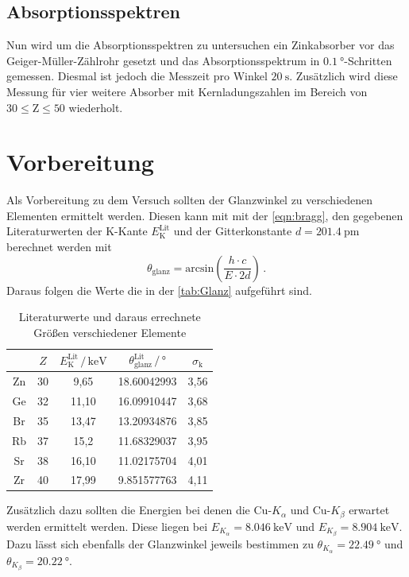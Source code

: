 \subsection{Absorptionsspektren}
Nun wird um die Absorptionsspektren zu untersuchen ein Zinkabsorber vor das Geiger-Müller-Zählrohr gesetzt und das Absorptionsspektrum in $\SI{0.1}{\degree}$-Schritten gemessen. Diesmal ist
jedoch die Messzeit pro Winkel $\SI{20}{\second}$. Zusätzlich wird diese Messung für vier weitere Absorber mit Kernladungszahlen im Bereich von $30 \leq \text{Z} \leq 50$ wiederholt.



\section{Vorbereitung}
Als Vorbereitung zu dem Versuch sollten der Glanzwinkel zu verschiedenen Elementen ermittelt werden. Diesen kann mit mit der \autoref{eqn:bragg}, den gegebenen Literaturwerten der 
K-Kante $E_\text{K}^\text{Lit}$ \cite{wissen} und der Gitterkonstante $d = \SI{201.4}{\pico\meter}$ berechnet werden mit 
\begin{equation}
    \theta_\text{glanz} = \text{arcsin}\left(\frac{h \cdot c}{E \cdot 2d}\right) \, .
    \label{eqn:theta}
\end{equation}
\noindent
Daraus folgen die Werte die in der \autoref{tab:Glanz} aufgeführt sind. 
\begin{table}
    \centering
    \caption{Literaturwerte und daraus errechnete Größen verschiedener Elemente}
    \label{tab:Glanz}
    \begin{tabular}{c c c c c}
    \toprule
    $ $ & $Z$ & $E_\text{K}^\text{Lit} \,/\, \si{\kilo\eV}$
    & $\theta_\text{glanz}^\text{Lit} \,/\, \si{\degree}$ & 
    $\sigma_\text{k}$\\
    \midrule 
    Zn & 30 &  9,65 & 18.60042993 & 3,56 \\
    Ge & 32 & 11,10 & 16.09910447 & 3,68 \\
    Br & 35 & 13,47 & 13.20934876 & 3,85 \\
    Rb & 37 & 15,2 & 11.68329037 & 3,95 \\
    Sr & 38 & 16,10 & 11.02175704 & 4,01 \\
    Zr & 40 & 17,99 &  9.851577763 & 4,11 \\
    \bottomrule
    \end{tabular}
    \end{table}

\noindent
Zusätzlich dazu sollten die Energien bei denen die Cu-$K_\alpha$ und Cu-$K_\beta$ erwartet werden ermittelt werden. Diese liegen bei $E_{K_\alpha} = \SI{8.046}{\kilo\eV}$ und $E_{K_\beta} = \SI{8.904}{\kilo\eV}$.
Dazu lässt sich ebenfalls der Glanzwinkel jeweils bestimmen zu $\theta_{K_\alpha} = \SI{22.49}{\degree}$ und $\theta_{K_\beta} = \SI{20.22}{\degree}$.